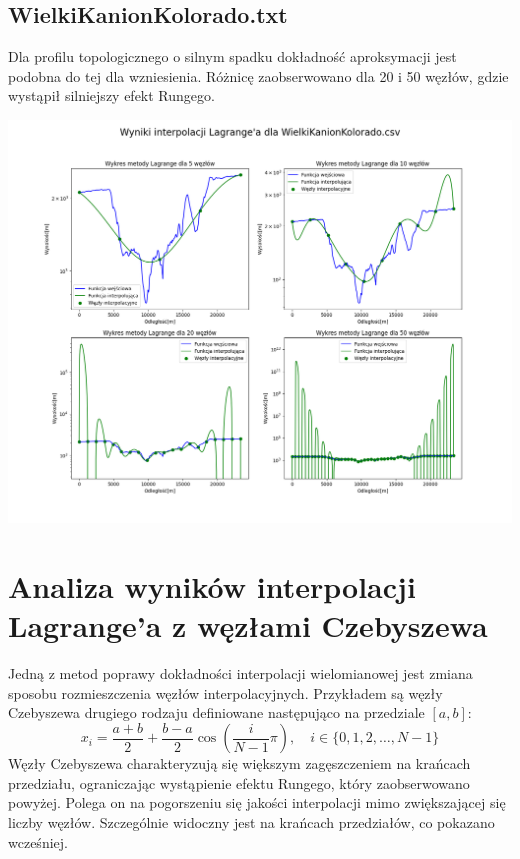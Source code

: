 \documentclass[a4paper,12pt]{article}
\begin{document}
	\subsection{WielkiKanionKolorado.txt}
	Dla profilu topologicznego o silnym spadku dokładność aproksymacji jest podobna do tej dla wzniesienia. Różnicę zaobserwowano dla 20 i 50 węzłów, gdzie wystąpił silniejszy efekt Rungego.
	\begin{center}
        \includegraphics[scale=0.4]{../charts/lagrange_WielkiKanionKolorado.png}
    \end{center}
    
\newpage   
\section{Analiza wyników interpolacji Lagrange'a z węzłami Czebyszewa}
	Jedną z metod poprawy dokładności interpolacji wielomianowej jest zmiana sposobu rozmieszczenia węzłów interpolacyjnych. Przykładem są węzły Czebyszewa drugiego rodzaju definiowane następująco na przedziale $[a, b]$:
	\begin{equation}
	x_i = \frac{a+b}{2} + \frac{b-a}{2}\cos(\frac{i}{N-1}\pi), \quad i \in \{0, 1, 2, \dots, N-1\}
	\end{equation}
	Węzły Czebyszewa charakteryzują się większym zagęszczeniem na krańcach przedziału, ograniczając wystąpienie efektu Rungego, który zaobserwowano powyżej. Polega on na pogorszeniu się jakości interpolacji mimo zwiększającej się liczby węzłów. Szczególnie widoczny jest na krańcach przedziałów, co pokazano wcześniej.
	
\end{document}
